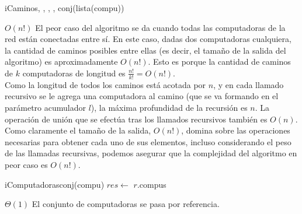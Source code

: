 \begin{Algoritmos}
  \begin{algoritmo}{iCaminos}{, , , , }{conj(lista(compu))}{}
  \end{algoritmo}
  {} %
  {} %
  {$O(n!)$} %
  {El peor caso del algoritmo se da cuando todas las computadoras de la red est\'an conectadas entre s\'i. En este caso, dadas dos computadoras cualquiera, la cantidad de caminos posibles entre ellas (es decir, el tama\~no de la salida del algoritmo) es aproximadamente $O(n!)$. Esto es porque la cantidad de caminos de $k$ computadoras de longitud es $\frac{n!}{k!} = O(n!)$. \\
  Como la longitud de todos los caminos est\'a acotada por $n$, y en cada llamado recursivo se le agrega una computadora al camino (que se va formando en el par\'ametro acumulador $l$), la m\'axima profundidad de la recursi\'on es $n$. La operaci\'on de uni\'on que se efect\'ua tras los llamados recursivos tambi\'en es $O(n)$. Como claramente el tama\~no de la salida, $O(n!)$, domina sobre las operaciones necesarias para obtener cada uno de sus elementos, incluso considerando el peso de las llamadas recursivas, podemos asegurar que la complejidad del algoritmo en peor caso es $O(n!)$.} %

  \begin{algoritmo}{iComputadoras}{}{conj(compu)}{}
    $res \gets$ $r$.compus 
  \end{algoritmo}
  \datosAlgoritmo{} %
  {} %
  {} %
  {$\Theta(1)$} %
  {El conjunto de computadoras se pasa por referencia.} %
   

\end{Algoritmos}
